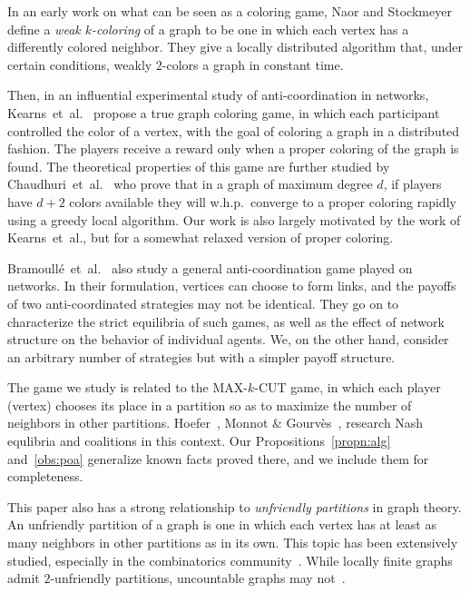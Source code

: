 \documentclass{llncs}
\begin{document}
In an early work on what can be seen as a coloring game, Naor and
Stockmeyer~\cite{NaorS93} define a \emph{weak $k$-coloring} of a graph to be
one in which each vertex has a differently colored neighbor.
They give a locally distributed algorithm that, under certain
conditions, weakly $2$-colors a graph in constant time. 

Then, in an influential experimental study of anti-coordination in networks,
Kearns~et~al.~\cite{KearnsSM06} propose a true graph coloring game, in which
each participant controlled the color of a vertex, with the goal of coloring a
graph in a distributed fashion.  The players receive a reward only when a
proper coloring of the graph is found.  The theoretical properties of this
game are further studied by Chaudhuri~et~al.~\cite{ChaudhuriGJ08} who prove
that in a graph of maximum degree $d$, if players have $d + 2$ colors available
they will w.h.p.\ converge to a proper coloring rapidly using a greedy local
algorithm.  Our work is also largely motivated by the work of Kearns~et~al.,
but for a somewhat relaxed version of proper coloring.

Bramoull\'{e}~et~al.~\cite{BramoulleLGV04} also study a general
anti-coordination game played on networks.  In their formulation, vertices can
choose to form links, and the payoffs of two anti-coordinated strategies
may not be identical.  They go on to characterize the strict equilibria of such
games, as well as the effect of network structure on the behavior of individual
agents.  We, on the other hand, consider an arbitrary number of strategies but
with a simpler payoff structure.

The game we study is related to the MAX-$k$-CUT game, in which
each player (vertex) chooses its place in a partition so as to maximize the
number of neighbors in other partitions. Hoefer~\cite{Hoefer2007}, Monnot \&
Gourv\`es~\cite{G09}, research Nash equlibria and coalitions in this
context. Our Propositions~\ref{propn:alg} and~\ref{obs:poa} generalize known
facts proved there, and we include them for completeness.

This paper also has a strong relationship to \emph{unfriendly
partitions} in graph theory.  An unfriendly partition of a graph is one in
which each vertex has at least as many neighbors in other partitions as in its
own.  This topic has been extensively studied, especially in the combinatorics
community~\cite{AharoniMP90,BruhnDGS10,CowanE,ShelahM90}.
While locally finite graphs admit $2$-unfriendly partitions, uncountable graphs 
may not~\cite{ShelahM90}.
\end{document}
